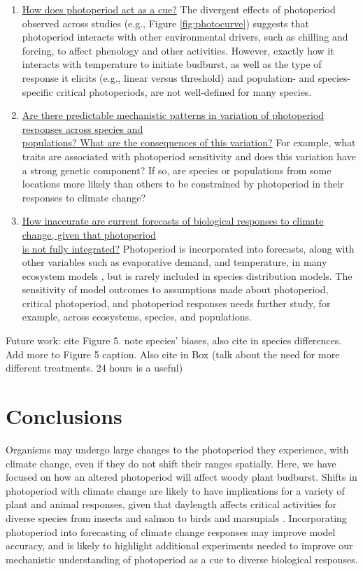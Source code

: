 \documentclass{article}
\begin{document}
\begin{enumerate}
\item \underline{How does photoperiod act as a cue?} The divergent effects of photoperiod observed across studies (e.g., Figure \ref{fig:photocurve}) suggests that photoperiod interacts with other environmental drivers, such as chilling and forcing, to affect phenology and other activities. However, exactly how it interacts with temperature to initiate budburst, as well as the type of response it elicits (e.g., linear versus threshold) and population- and species-specific critical photoperiods, are not well-defined for many species.  
\item \underline{Are there predictable mechanistic patterns in variation of photoperiod responses across species and \\populations? What are the consequences of this variation?} For example, what traits are associated with photoperiod sensitivity and does this variation have a strong genetic component? If so, are species or populations from some locations more likely than others to be constrained by photoperiod in their responses to climate change?

\item \underline{How inaccurate are current forecasts of biological responses to climate change, given that photoperiod \\is not fully integrated?} Photoperiod is incorporated into forecasts, along with other variables such as evaporative demand, and temperature, in many ecosystem models \citep [e.g. ED] []{jolly2005, medvigy2013}, but is rarely included in species distribution models. The sensitivity of model outcomes to assumptions made about photoperiod, critical photoperiod, and photoperiod responses needs further study, for example, across ecosystems, species, and populations.

\end{enumerate}

Future work: cite Figure 5. note species' biases, also cite in species differences. Add more to Figure 5 caption.  Also cite in Box (talk about the need for more different treatments. 24 hours is a useful) 


\section*{Conclusions}
Organisms may undergo large changes to the photoperiod they experience, with climate change, even if they do not shift their ranges spatially.  Here, we have focused on how an altered photoperiod will affect woody plant budburst. Shifts in photoperiod with climate change are likely to have implications for a variety of plant and animal responses, given that daylength affects critical activities for diverse species from insects \citep{bradshaw2006,linn1996} and salmon \citep{solbakken1994,taranger2003} to birds \citep{dawson2001} and marsupials \citep{mcallan2006,solbakken1994}. Incorporating photoperiod into forecasting of climate change responses may improve model accuracy, and is likely to highlight additional experiments needed to improve our mechanistic understanding of photoperiod as a cue to diverse biological responses. 
\end{document}
